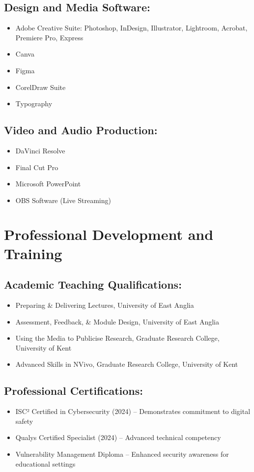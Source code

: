 \documentclass[a4paper,11pt]{article}
\newcommand{\resumeItem}[1]{
  \item\small{
    {#1 \vspace{-2pt}}
  }
}
\newcommand{\resumeItemListStart}{\begin{itemize}}
\newcommand{\resumeItemListEnd}{\end{itemize}\vspace{-5pt}}
\begin{document}
\subsection{Design and Media Software:}
    \resumeItemListStart
        \resumeItem{Adobe Creative Suite: Photoshop, InDesign, Illustrator, Lightroom, Acrobat, Premiere Pro, Express}
        \resumeItem{Canva}
        \resumeItem{Figma}
        \resumeItem{CorelDraw Suite}
        \resumeItem{Typography}
    \resumeItemListEnd

\subsection{Video and Audio Production:}
    \resumeItemListStart
        \resumeItem{DaVinci Resolve}
        \resumeItem{Final Cut Pro}
        \resumeItem{Microsoft PowerPoint}
        \resumeItem{OBS Software (Live Streaming)}
    \resumeItemListEnd


\section{Professional Development and Training}
\subsection{Academic Teaching Qualifications:}
    \resumeItemListStart
        \resumeItem{Preparing \& Delivering Lectures, University of East Anglia}
        \resumeItem{Assessment, Feedback, \& Module Design, University of East Anglia}
        \resumeItem{Using the Media to Publicise Research, Graduate Research College, University of Kent}
        \resumeItem{Advanced Skills in NVivo, Graduate Research College, University of Kent}
    \resumeItemListEnd

\subsection{Professional Certifications:}
    \resumeItemListStart
        \resumeItem{ISC² Certified in Cybersecurity (2024) -- Demonstrates commitment to digital safety}
        \resumeItem{Qualys Certified Specialist (2024) -- Advanced technical competency}
        \resumeItem{Vulnerability Management Diploma -- Enhanced security awareness for educational settings}
    \resumeItemListEnd
\end{document}
